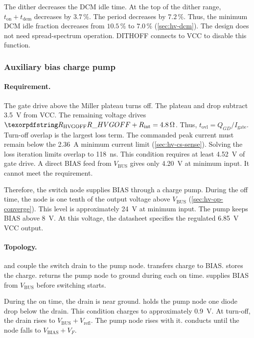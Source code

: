 The dither decreases the DCM idle time. At the top of the dither range,
$t_{\mathrm{on}}+t_{\mathrm{dem}}$ decreases by $3.7\,\%$. The period decreases
by $7.2\,\%$. Thus, the minimum DCM idle fraction decreases from $10.5\,\%$ to
$7.0\,\%$ (\cref{sec:hv-dcm}). The design does not need spread-spectrum
operation. DITHOFF connects to VCC to disable this function.

\subsubsection{Auxiliary bias charge pump}\label{sec:hv-house-pump}

\paragraph{Requirement.} The gate drive above the Miller plateau turns
 off. The plateau and  drop subtract
\SI{3.5}{\volt} from VCC. The remaining voltage drives
$\des{R}{HVGOFF}+R_{\mathrm{int}} = \SI{4.8}{\ohm}$. Thus,
$t_{\mathrm{ovl}} = Q_{GD}/I_{\mathrm{gate}}$. Turn-off overlap is the largest
loss term. The commanded peak current must remain below the
\SI{2.36}{\ampere} minimum current limit (\cref{sec:hv-cs-sense}). Solving the
loss iteration limits overlap to \SI{118}{\nano\second}. This condition
requires at least \SI{4.52}{\volt} of gate drive. A direct BIAS feed from
$V_{\mathrm{BUS}}$ gives only \SI{4.20}{\volt} at minimum input. It cannot meet
the requirement.

Therefore, the switch node supplies BIAS through a charge pump. During the off
time, the node is one tenth of the output voltage above $V_{\mathrm{BUS}}$
(\cref{sec:hv-op-converge}). This level is approximately \SI{24}{\volt} at
minimum input. The pump keeps BIAS above \SI{8}{\volt}. At this voltage, the
datasheet specifies the regulated \SI{6.85}{\volt} VCC output.

\paragraph{Topology.}  and  couple the switch
drain to the pump node.  transfers charge to BIAS.
 stores the charge.  returns the pump node to
ground during each on time.  supplies BIAS from
$V_{\mathrm{BUS}}$ before switching starts.

During the on time, the drain is near ground.  holds the pump
node one diode drop below the drain. This condition charges  to
approximately \SI{0.9}{\volt}. At turn-off, the drain rises to
$V_{\mathrm{BUS}} + V_{\mathrm{refl}}$. The pump node rises with it.
 conducts until the node falls to $V_{\mathrm{BIAS}} + V_F$.

